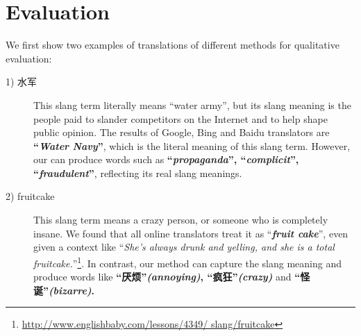 \section{Evaluation}
We first show two 
examples of translations of different methods for qualitative evaluation:
\begin{description}
	\item[1) 水军] This slang term literally means ``water army'', but its slang meaning is the people paid to slander competitors on the Internet and to help shape public opinion. The results of Google, Bing and Baidu translators are \textbf{``\textit{Water} \textit{Navy}''}, which is the literal meaning of this slang term. However, our \textit{\socvec}  can produce words such as \textbf{{``\textit{propaganda}'', ``\textit{complicit}'', ``\textit{fraudulent}''}}, reflecting its real slang meanings.
	
	\item[2) fruitcake] This slang term means a crazy person, or someone who is completely insane. 
	We found that all online translators treat it as ``\textit{\textbf{fruit cake}}'', even given a context like ``\textit{She’s always drunk and yelling, and she is a total fruitcake.}''\footnote{{\tiny \url{ http://www.englishbaby.com/lessons/4349/
slang/fruitcake}}}. 
	In contrast, our method can capture the slang meaning and produce words like \textbf{``厌烦''{\textit{(annoying)}}, ``疯狂''\textit{(crazy)} } and \textbf{ ``怪诞''\textit{(bizarre)}.}
\end{description} 
% 

